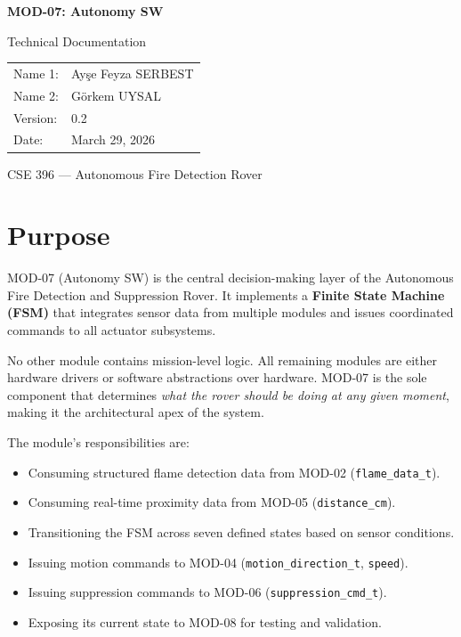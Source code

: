 \documentclass[12pt,a4paper]{article}
\begin{document}
\begin{titlepage}
\centering
\vspace*{2cm}

{\Huge\bfseries MOD-07: Autonomy SW\par}
\vspace{0.5cm}
{\Large Technical Documentation\par}

\vspace{2cm}

\begin{tabular}{ll}
Name 1: & Ayşe Feyza SERBEST \\
Name 2: & Görkem UYSAL \\
Version: & 0.2 \\
Date: & March 29, 2026 \\
\end{tabular}

\vfill
CSE 396 — Autonomous Fire Detection Rover
\end{titlepage}

\tableofcontents
\newpage

\section{Purpose}

MOD-07 (Autonomy SW) is the central decision-making layer of the Autonomous Fire Detection
and Suppression Rover. It implements a \textbf{Finite State Machine (FSM)} that integrates sensor
data from multiple modules and issues coordinated commands to all actuator subsystems.

No other module contains mission-level logic. All remaining modules are either hardware drivers
or software abstractions over hardware. MOD-07 is the sole component that determines \emph{what
the rover should be doing at any given moment}, making it the architectural apex of the system.

The module's responsibilities are:
\begin{itemize}[leftmargin=1.5em]
    \item Consuming structured flame detection data from MOD-02 (\texttt{flame\_data\_t}).
    \item Consuming real-time proximity data from MOD-05 (\texttt{distance\_cm}).
    \item Transitioning the FSM across seven defined states based on sensor conditions.
    \item Issuing motion commands to MOD-04 (\texttt{motion\_direction\_t}, \texttt{speed}).
    \item Issuing suppression commands to MOD-06 (\texttt{suppression\_cmd\_t}).
    \item Exposing its current state to MOD-08 for testing and validation.
\end{itemize}
\end{document}
